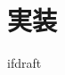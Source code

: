 \documentclass{jsarticle}
\begin{document}
    \fi
    \section{実装}

    \expandafter\ifx\csname ifdraft\endcsname\relax
\end{document}
